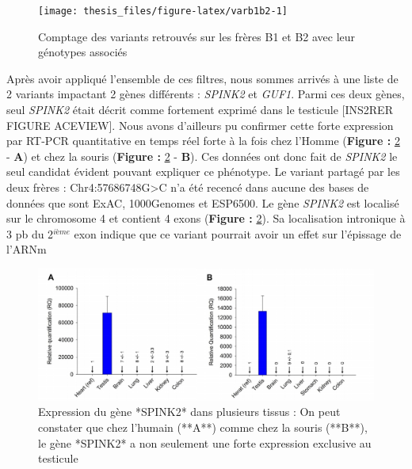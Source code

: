 \documentclass[12pt,twoside]{reedthesis}
\theoremstyle{definition}
\theoremstyle{definition}
\theoremstyle{remark}
\begin{document}
  \begin{figure}
  
  {\centering \texttt{[image: thesis\_files/figure-latex/varb1b2-1]} 
  
  }
  
  \caption[Comptage des variants retrouvés sur les frères B1 et B2 avec leur génotypes associés]{Comptage des variants retrouvés sur les frères B1 et B2 avec leur génotypes associés}\label{fig:varb1b2}
  \end{figure}
  
  Après avoir appliqué l'ensemble de ces filtres, nous sommes arrivés à
  une liste de 2 variants impactant 2 gènes différents : \emph{SPINK2} et
  \emph{GUF1}. Parmi ces deux gènes, seul \emph{SPINK2} était décrit comme
  fortement exprimé dans le testicule {[}INS2RER FIGURE ACEVIEW{]}. Nous
  avons d'ailleurs pu confirmer cette forte expression par RT-PCR
  quantitative en temps réel forte à la fois chez l'Homme (\textbf{Figure
  : }\ref{fig:spink2exp} - \textbf{A}) et chez la souris (\textbf{Figure :
  }\ref{fig:spink2exp} - \textbf{B}). Ces données ont donc fait de
  \emph{SPINK2} le seul candidat évident pouvant expliquer ce phénotype.
  Le variant partagé par les deux frères : Chr4:57686748G\textgreater{}C
  n'a été recencé dans aucune des bases de données que sont ExAC,
  1000Genomes et ESP6500. Le gène \emph{SPINK2} est localisé sur le
  chromosome 4 et contient 4 exons (\textbf{Figure :
  }\ref{fig:spink2exp}). Sa localisation intronique à 3 pb du 2\(^{ième}\)
  exon indique que ce variant pourrait avoir un effet sur l'épissage de
  l'ARNm
  
  \begin{figure}
  
  {\centering \includegraphics[scale=0.42]{figure/spink2_expression} 
  
  }
  
  \caption[Expression du gène *SPINK2* dans plusieurs tissus]{Expression du gène *SPINK2* dans plusieurs tissus : On peut constater que chez l'humain (**A**) comme chez la souris (**B**), le gène *SPINK2* a non seulement une forte expression exclusive au testicule}\label{fig:spink2exp}
  \end{figure}
  
\end{document}
